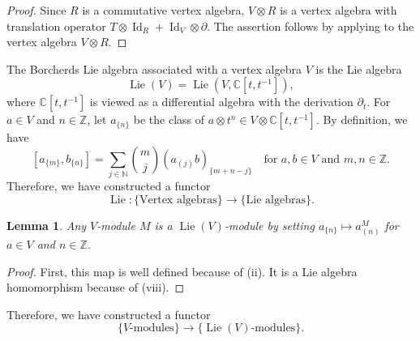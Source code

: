 \documentclass[a4paper, 12pt, reqno]{amsart}
\newtheorem{lemma}[theorem]{Lemma}
\theoremstyle{remark}
\numberwithin{equation}{subsection}
\DeclareMathOperator{\Id}{Id}
\DeclareMathOperator{\Lie}{Lie}
\begin{document}
\begin{proof}
  Since $R$ is a commutative vertex algebra, $V \otimes R$ is a vertex algebra with translation operator $T\otimes\Id_R + \Id_V\otimes\partial$.
  The assertion follows by applying  to the vertex algebra $V \otimes R$.
\end{proof}

The Borcherds Lie algebra associated with a vertex algebra $V$ is the Lie algebra
\begin{equation*}
  \Lie(V) = \Lie(V, \mathbb{C}[t, t^{-1}]),
\end{equation*}
where $\mathbb{C}[t, t^{-1}]$ is viewed as a differential algebra with the derivation $\partial_t$.
For $a \in V$ and $n \in \mathbb{Z}$, let $a_{\{n\}}$ be the class of $a\otimes t^n \in V \otimes \mathbb{C}[t, t^{-1}]$.
By definition, we have
\begin{equation}
  \label{eq:24}
  [a_{\{m\}}, b_{\{n\}}] = \sum_{j \in \mathbb{N}}\binom{m}{j}(a_{(j)}b)_{\{m + n - j\}}\quad \text{for }a, b \in V\text{ and }m, n \in \mathbb{Z}.
\end{equation}
Therefore, we have constructed a functor
\begin{equation*}
  \Lie: \{\text{Vertex algebras}\} \to \{\text{Lie algebras}\}.
\end{equation*}

\begin{lemma}
  \label{lmm:10}
  Any $V$-module $M$ is a $\Lie(V)$-module by setting $a_{\{n\}} \mapsto a^M_{(n)}$ for $a \in V$ and $n \in \mathbb{Z}$.
\end{lemma}

\begin{proof}
  First, this map is well defined because of (ii).
  It is a Lie algebra homomorphism because of (viii).
\end{proof}

Therefore, we have constructed a functor
\begin{equation*}
  \{\text{$V$-modules}\} \to \{\text{$\Lie(V)$-modules}\}.
\end{equation*}
\end{document}
